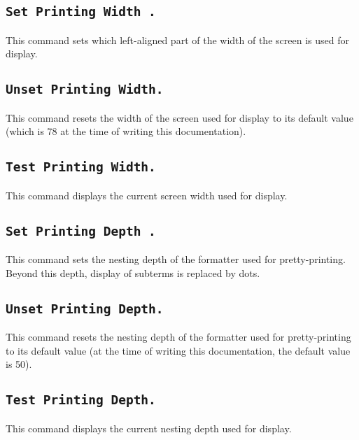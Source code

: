 \subsection{\tt Set Printing Width {\integer}.}
This command sets which left-aligned part of the width of the screen
is used for display. 

\subsection{\tt Unset Printing Width.}
This command resets the width of the screen used for display to its
default value (which is 78 at the time of writing this documentation).

\subsection{\tt Test Printing Width.}
This command displays the current screen width used for display.

\subsection{\tt Set Printing Depth {\integer}.}
This command sets the nesting depth of the formatter used for
pretty-printing. Beyond this depth, display of subterms is replaced by
dots. 

\subsection{\tt Unset Printing Depth.}
This command resets the nesting depth of the formatter used for
pretty-printing to its default value (at the
time of writing this documentation, the default value is 50).

\subsection{\tt Test Printing Depth.}
This command displays the current nesting depth used for display.




